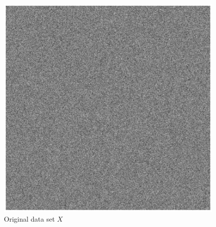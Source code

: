 \begin{figure}
  \centering
  \begin{minipage}[t]{.45\textwidth}
    \centering
    \includegraphics[width=.95\textwidth]{images/pca-1.eps}
    \caption{Original data set $X$}
    \label{fig:pca-1}
\end{minipage}
\hfill
  \begin{minipage}[t]{.45\textwidth}
    \centering

\end{minipage}
\end{figure}
